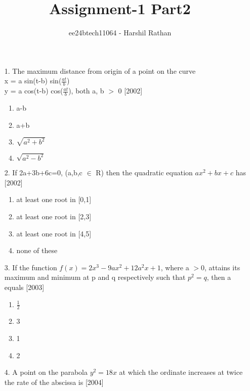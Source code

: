 \documentclass[journal,12pt,twocolumn]{IEEEtran}
\theoremstyle{remark}
\begin{document}

\vspace{3cm}

\title{Assignment-1 Part2}
\author{ee24btech11064 - Harshil Rathan}
\maketitle
\newpage
\bigskip

\renewcommand{\thefigure}{\theenumi}
\renewcommand{\thetable}{\theenumi}
\begin{enumerate}
\item[1.]The maximum distance from origin of a point on the curve\\ x = a sin(t-b) sin($\frac{at}{b}$)\\ y = a cos(t-b) cos($\frac{at}{b}$), both a, b $>$ 0 \hfill{[2002]}
\begin{enumerate}
    \item a-b
    \item a+b
    \item $\sqrt{a^2+b^2}$
    \item $\sqrt{a^2-b^2}$  \\ 
\end{enumerate}
\item[2.]If 2a+3b+6c=0, (a,b,c $\in$ R) then the quadratic equation $ax^2+bx+c$ has \hfill{[2002]}
\begin{enumerate}
    \item at least one root in [0,1]
    \item at  least one root in [2,3]
    \item at least one root in [4,5]
    \item none of these \\
\end{enumerate}
\item[3.]If the function $f(x)=2x^3-9ax^2+12a^2x+1$, where a $>$0, attains its maximum and minimum at p and q respectively such that $p
    ^2=q$, then a equals  \hfill{[2003]}
\begin{enumerate}
       \item $\frac{1}{2}$
       \item 3
       \item 1
       \item 2
\end{enumerate}
\item[4.]A point on the parabola $y^2=18x$ at which the ordinate increases at twice the rate of the abscissa is \hfill{[2004]}
\begin{enumerate}

\end{enumerate}
\end{enumerate}
\end{document}
